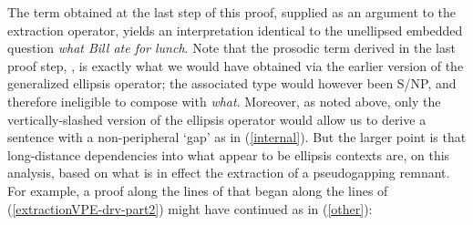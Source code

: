 \documentclass[output=paper,colorlinks,citecolor=brown]{langscibook}
\begin{document}
\begin{exe}
 \ex\label{extractionVPE-drv-part2}
\end{exe}

\noindent The term obtained at the last step of this proof, supplied as an
argument to the extraction operator, yields an interpretation
identical to the unellipsed embedded question \textit{what Bill ate for
lunch}. Note that the prosodic term derived in the last proof step,
, is exactly what we would have obtained via
the earlier version of the generalized ellipsis operator; the
associated type would however been S/NP, and therefore ineligible to
compose with \textit{what}. Moreover, as noted above, only the
vertically-slashed version of the ellipsis operator would allow us to
derive a sentence with a non-peripheral `gap' as in (\ref{internal}).
But the larger point is that long-distance dependencies into what
appear to be ellipsis contexts are, on this analysis, based on what is
in effect the extraction of a pseudogapping remnant. For example,
a proof along the lines of that began along the lines of
(\ref{extractionVPE-drv-part2}) might have continued as in (\ref{other}):
\end{document}
